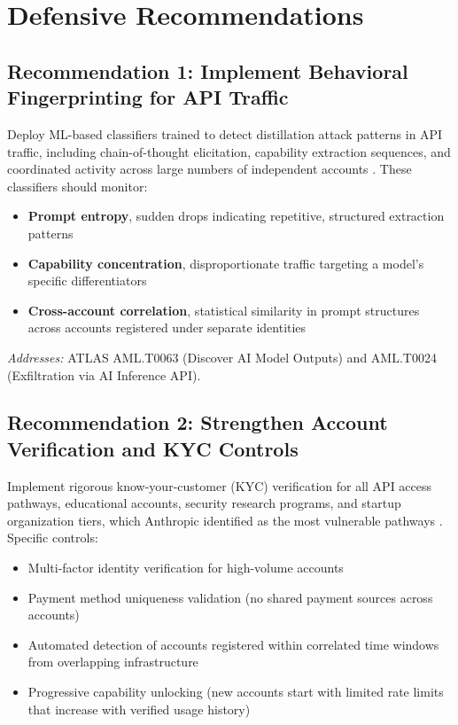 \documentclass[11pt,a4paper]{article}
\begin{document}
\newpage

\section{Defensive Recommendations}

\subsection{Recommendation 1: Implement Behavioral Fingerprinting for API Traffic}

Deploy ML-based classifiers trained to detect distillation attack patterns in API traffic, including chain-of-thought elicitation, capability extraction sequences, and coordinated activity across large numbers of independent accounts \cite{anthropic_blog}. These classifiers should monitor:

\begin{itemize}[leftmargin=20pt, noitemsep]
    \item \textbf{Prompt entropy}, sudden drops indicating repetitive, structured extraction patterns
    \item \textbf{Capability concentration}, disproportionate traffic targeting a model's specific differentiators
    \item \textbf{Cross-account correlation}, statistical similarity in prompt structures across accounts registered under separate identities
\end{itemize}

\noindent\textit{Addresses:} ATLAS AML.T0063 (Discover AI Model Outputs) and AML.T0024 (Exfiltration via AI Inference API).

\subsection{Recommendation 2: Strengthen Account Verification and KYC Controls}

Implement rigorous know-your-customer (KYC) verification for all API access pathways, educational accounts, security research programs, and startup organization tiers, which Anthropic identified as the most vulnerable pathways \cite{anthropic_blog}. Specific controls:

\begin{itemize}[leftmargin=20pt, noitemsep]
    \item Multi-factor identity verification for high-volume accounts
    \item Payment method uniqueness validation (no shared payment sources across accounts)
    \item Automated detection of accounts registered within correlated time windows from overlapping infrastructure
    \item Progressive capability unlocking (new accounts start with limited rate limits that increase with verified usage history)
\end{itemize}
\end{document}
